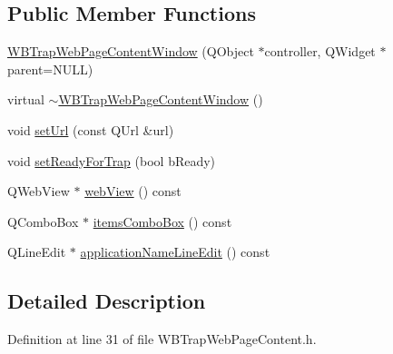 \subsection*{Public Member Functions}
\begin{DoxyCompactItemize}
\item 
\hyperlink{class_w_b_trap_web_page_content_window_a1a66bd0984604b17a3e2fbc811d64267}{W\-B\-Trap\-Web\-Page\-Content\-Window} (Q\-Object $\ast$controller, Q\-Widget $\ast$parent=N\-U\-L\-L)
\item 
virtual \hyperlink{class_w_b_trap_web_page_content_window_a2d10694e0ad63788d1b533a1e7e65d63}{$\sim$\-W\-B\-Trap\-Web\-Page\-Content\-Window} ()
\item 
void \hyperlink{class_w_b_trap_web_page_content_window_ae55712be0ce5375e4295fdb8c496c5df}{set\-Url} (const Q\-Url \&url)
\item 
void \hyperlink{class_w_b_trap_web_page_content_window_a6c27c25e166c5b8c67a8e714dafa5c29}{set\-Ready\-For\-Trap} (bool b\-Ready)
\item 
Q\-Web\-View $\ast$ \hyperlink{class_w_b_trap_web_page_content_window_af4d6b01ff7fb31ba3fee342415eb6b88}{web\-View} () const 
\item 
Q\-Combo\-Box $\ast$ \hyperlink{class_w_b_trap_web_page_content_window_af82a9c2247ad960888b30305926610c8}{items\-Combo\-Box} () const 
\item 
Q\-Line\-Edit $\ast$ \hyperlink{class_w_b_trap_web_page_content_window_af4b8a9b293b0ef10b4936d871172fcd1}{application\-Name\-Line\-Edit} () const 
\end{DoxyCompactItemize}


\subsection{Detailed Description}


Definition at line 31 of file W\-B\-Trap\-Web\-Page\-Content.\-h.



